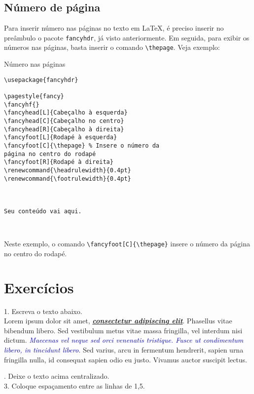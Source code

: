 \subsection{Número de página}
Para inserir número nas páginas no texto em \LaTeX{}, é preciso inserir no preâmbulo o pacote \verb|fancyhdr|, já visto anteriormente. Em seguida, para exibir os números nas páginas, basta inserir o comando \verb|\thepage|. Veja exemplo:
\begin{trailer}{Número nas páginas}
\begin{verbatim}
\usepackage{fancyhdr}

\pagestyle{fancy}
\fancyhf{}
\fancyhead[L]{Cabeçalho à esquerda}
\fancyhead[C]{Cabeçalho no centro}
\fancyhead[R]{Cabeçalho à direita}
\fancyfoot[L]{Rodapé à esquerda}
\fancyfoot[C]{\thepage} % Insere o número da 
página no centro do rodapé
\fancyfoot[R]{Rodapé à direita}
\renewcommand{\headrulewidth}{0.4pt}
\renewcommand{\footrulewidth}{0.4pt}



Seu conteúdo vai aqui.



\end{verbatim}
\end{trailer}

\noindent Neste exemplo, o comando \verb|\fancyfoot[C]{\thepage}| insere o número da página no centro do rodapé.

\section{Exercícios}

1. Escreva o texto abaixo.\\

\noindent Lorem ipsum dolor sit amet, \textbf{\textit{\underline{consectetur adipiscing elit}}}. Phasellus vitae bibendum libero. Sed vestibulum metus vitae massa fringilla, vel interdum nisi dictum. \textcolor{blue}{\textit{Maecenas vel neque sed orci venenatis tristique. Fusce ut condimentum libero, in tincidunt libero.}} Sed varius, arcu in fermentum hendrerit, sapien urna fringilla nulla, id consequat sapien odio eu justo. Vivamus auctor suscipit lectus.\\
\doublespacing

. Deixe o texto acima centralizado.\\
3. Coloque espaçamento entre as linhas de 1,5.


